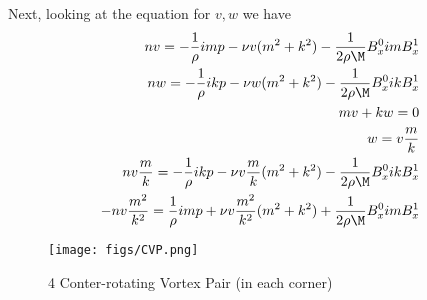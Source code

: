 \documentclass[11pt]{article}
\newcommand{\BfigS}{50em}
\newcommand{\BfigH}{\BfigS}
\newcommand{\BfigW}{\BfigS}
\begin{document}
Next, looking at the equation for $v,w$ we have
\begin{equation}\begin{aligned}
n v = -\frac{1}{\rho} im p - \nu v (m^2+k^2) - \frac{1}{2\rho \M} B_x^0 im B_x^1 \\
n w = -\frac{1}{\rho} ik p - \nu w (m^2+k^2) - \frac{1}{2\rho \M} B_x^0 ik B_x^1 \\
m v + k w = 0 \\
w = v \frac{m}{k} \\
  n v \frac{m}{k}     = -\frac{1}{\rho} ik p - \nu v \frac{m}{k} (m^2+k^2)     - \frac{1}{2\rho \M} B_x^0 ik B_x^1 \\
- n v \frac{m^2}{k^2} = \frac{1}{\rho} im p  + \nu v \frac{m^2}{k^2} (m^2+k^2) + \frac{1}{2\rho \M} B_x^0 im B_x^1 \\
\end{aligned} \end{equation}



\newpage

\begin{figure}[H]
 \centering
  \texttt{[image: figs/CVP.png]}
   \caption[Optional ]{4 Conter-rotating Vortex Pair (in each corner)}
\end{figure}




\end{document}
